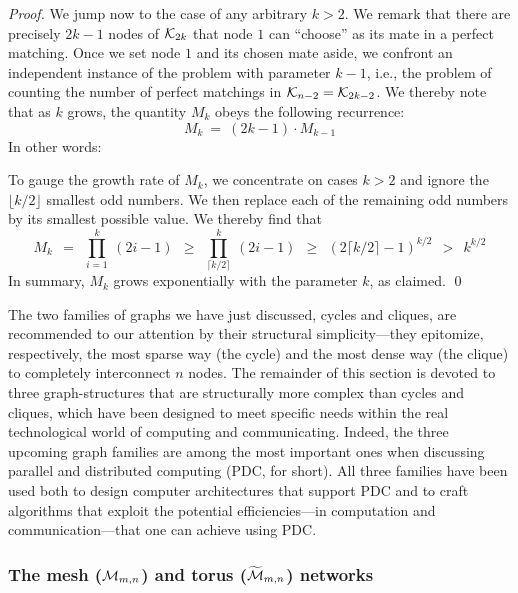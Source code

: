 \begin{proof}
We jump now to the case of any arbitrary $k > 2$.  We remark that
there are precisely $2k-1$ nodes of $\mbox{$\cal K$}_{2k}$ that node $1$ can
``choose'' as its mate in a perfect matching.  Once we set node $1$
and its chosen mate aside, we confront an independent instance of the
problem with parameter $k-1$, i.e., the problem of counting the number
of perfect matchings in $\mbox{$\cal K$}_{n-2} = \mbox{$\cal K$}_{2k-2}$.  We thereby note that
as $k$ grows, the quantity $M_k$ obeys the following recurrence:
\[ M_k \ = \ (2k-1) \cdot M_{k-1} \]
In other words:

\hspace*{.25in}{\em $M_k$ is the product of the first $k$ odd numbers.}

\noindent
To gauge the growth rate of $M_k$, we concentrate on cases $k > 2$ and
ignore the $\lfloor k/2 \rfloor$ smallest odd numbers.  We then
replace each of the remaining odd numbers by its smallest possible
value.  We thereby find that
\[
M_k \ \ =    \ \ \prod_{i=1}^k \ (2i-1)
    \ \ \geq \ \ \prod_{\lceil k/2 \rceil}^k \ (2i-1)
    \ \ \geq \ \ \left( 2 \lceil k/2 \rceil -1 \right)^{k/2}
    \ \ >    \ \ k^{k/2}
\]
In summary, $M_k$ grows exponentially with the parameter $k$, as claimed.
\qed
\end{proof}


\bigskip

The two families of graphs we have just discussed, cycles and cliques,
are recommended to our attention by their structural simplicity---they
epitomize, respectively, the most sparse way (the cycle) and the most
dense way (the clique) to completely interconnect $n$ nodes.  The
remainder of this section is devoted to three graph-structures that
are structurally more complex than cycles and cliques, which have been
designed to meet specific needs within the real technological world of
computing and communicating.  Indeed, the three upcoming graph
families are among the most important ones when discussing parallel
and distributed computing (PDC, for short).  All three families have
been used both to design computer architectures that support PDC and
to craft algorithms that exploit the potential efficiencies---in
computation and communication---that one can achieve using PDC.

\subsubsection{The mesh ($\mbox{$\cal M$}_{m,n}$) and torus ($\widetilde{\mbox{$\cal M$}}_{m,n}$) networks}
\label{sec:mesh}

